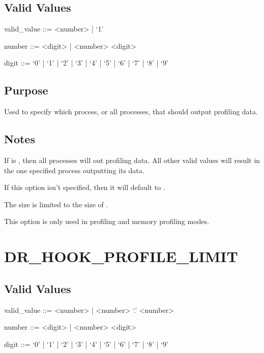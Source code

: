 \documentclass[letterpaper,10pt,english]{sphinxmanual}
\begin{document}
\subsection{Valid Values}
\label{\detokenize{flag/flag:id71}}
\begin{DUlineblock}{0em}
\item[] valid\_value ::= \textless{}number\textgreater{} | ‘\sphinxhyphen{}1’
\item[] number ::= \textless{}digit\textgreater{} | \textless{}number\textgreater{} \textless{}digit\textgreater{}
\item[] digit ::= ‘0’ | ‘1’ | ‘2’ | ‘3’ | ‘4’ | ‘5’ | ‘6’ | ‘7’ | ‘8’ | ‘9’
\end{DUlineblock}


\subsection{Purpose}
\label{\detokenize{flag/flag:id72}}
\sphinxAtStartPar
Used to specify which process, or all processes, that should output profiling data.


\subsection{Notes}
\label{\detokenize{flag/flag:id73}}
\sphinxAtStartPar
If  is , then all processes will out profiling data. All other valid values will result in the one specified process outputting its data.

\sphinxAtStartPar
If this option isn’t specified, then it will default to .

\sphinxAtStartPar
The size is limited to the size of .

\sphinxAtStartPar
This option is only used in profiling and memory profiling modes.


\section{DR\_HOOK\_PROFILE\_LIMIT}
\label{\detokenize{flag/flag:dr-hook-profile-limit}}\label{\detokenize{flag/flag:id75}}

\subsection{Valid Values}
\label{\detokenize{flag/flag:id76}}
\begin{DUlineblock}{0em}
\item[] valid\_value ::= \textless{}number\textgreater{} | \textless{}number\textgreater{} ‘.’ \textless{}number\textgreater{}
\item[] number ::= \textless{}digit\textgreater{} | \textless{}number\textgreater{} \textless{}digit\textgreater{}
\item[] digit ::= ‘0’ | ‘1’ | ‘2’ | ‘3’ | ‘4’ | ‘5’ | ‘6’ | ‘7’ | ‘8’ | ‘9’
\end{DUlineblock}
\end{document}
